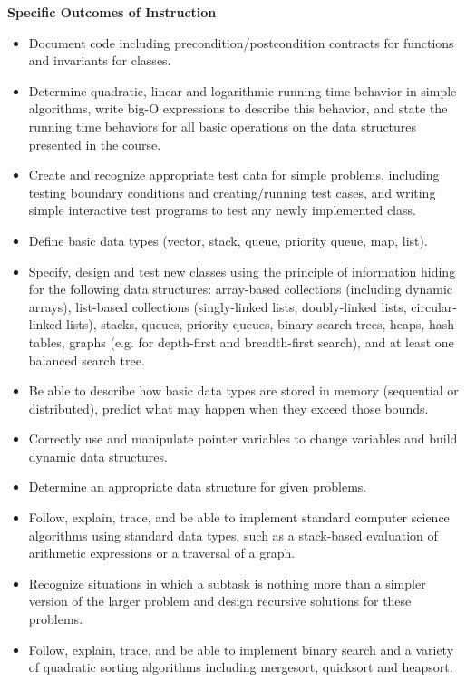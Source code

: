\documentclass{article}
\begin{document}
\noindent \textbf{Specific Outcomes of Instruction}
\begin{itemize}
    \item Document code including precondition/postcondition contracts for functions and invariants for classes.
    \item Determine quadratic, linear and logarithmic running time behavior in simple algorithms, write big-O expressions to describe this behavior, and state the running time behaviors for all basic operations on the data structures presented in the course.
    \item Create and recognize appropriate test data for simple problems, including testing boundary conditions and creating/running test cases, and writing simple interactive test programs to test any newly implemented class.
    \item Define basic data types (vector, stack, queue, priority queue, map, list).
    \item Specify, design and test new classes using the principle of information hiding for the following data structures: array-based collections (including dynamic arrays), list-based collections (singly-linked lists, doubly-linked lists, circular-linked lists), stacks, queues, priority queues, binary search trees, heaps, hash tables, graphs (e.g. for depth-first and breadth-first search), and at least one balanced search tree.
    \item Be able to describe how basic data types are stored in memory (sequential or distributed), predict what may happen when they exceed those bounds.
    \item Correctly use and manipulate pointer variables to change variables and build dynamic data structures.
    \item Determine an appropriate data structure for given problems.
    \item Follow, explain, trace, and be able to implement standard computer science algorithms using standard data types, such as a stack-based evaluation of arithmetic expressions or a traversal of a graph.
    \item Recognize situations in which a subtask is nothing more than a simpler version of the larger problem and design recursive solutions for these problems.
    \item Follow, explain, trace, and be able to implement binary search and a variety of quadratic sorting algorithms including mergesort, quicksort and heapsort.
\end{itemize}
\end{document}
